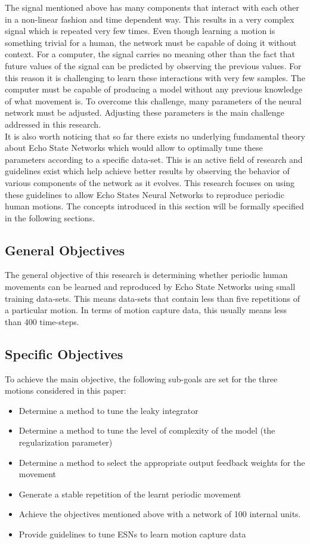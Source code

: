 \documentclass[letterpaper,9pt]{article}
\begin{document}
The signal mentioned above has many components that interact with each other in a non-linear fashion and time dependent way. This results in a very complex signal which is repeated very few times. Even though learning a motion is something trivial for a human, the network must be capable of doing it without context. For a computer, the signal carries no meaning other than the fact that future values of the signal can be predicted by observing the previous values. For this reason it is challenging to learn these interactions with very few samples. The computer must be capable of producing a model without any previous knowledge of what movement is. To overcome this challenge, many parameters of the neural network must be adjusted. Adjusting these parameters is the main challenge addressed in this research.\\

It is also worth noticing that so far there exists no underlying fundamental theory about Echo State Networks which would allow to optimally tune these parameters according to a specific data-set. This is an active field of research and guidelines exist which help achieve better results by observing the behavior of various components of the network as it evolves. This research focuses on using these guidelines to allow Echo States Neural Networks to reproduce periodic human motions. The concepts introduced in this section will be formally specified in the following sections.

\subsection{General Objectives}

The general objective of this research is determining whether periodic human movements can be learned and reproduced by Echo State Networks using small training data-sets. This means data-sets that contain less than five repetitions of a particular motion. In terms of motion capture data, this usually means less than 400 time-steps.

\subsection{Specific Objectives}

To achieve the main objective, the following sub-goals are set for the three motions considered in this paper:

\begin{itemize}
  \item Determine a method to tune the leaky integrator
  \item Determine a method to tune the level of complexity of the model (the regularization parameter)
  \item Determine a method to select the appropriate output feedback weights for the movement
  \item Generate a stable repetition of the learnt periodic movement
  \item Achieve the objectives mentioned above with a network of 100 internal units.
  \item Provide guidelines to tune ESNs to learn motion capture data
\end{itemize}
\end{document}
